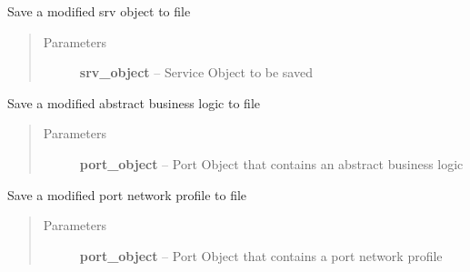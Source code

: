 \documentclass[letterpaper,10pt,english]{sphinxmanual}
\begin{document}
\begin{fulllineitems}

\begin{fulllineitems}
\label{class_Project:ROSMOD_Project.save_srv}
Save a modified srv object to file
\begin{quote}\begin{description}
\item[{Parameters}] \leavevmode
\textbf{srv\_object} -- Service Object to be saved

\end{description}\end{quote}

\end{fulllineitems}


\begin{fulllineitems}
\label{class_Project:ROSMOD_Project.save_abl}
Save a modified abstract business logic to file
\begin{quote}\begin{description}
\item[{Parameters}] \leavevmode
\textbf{port\_object} -- Port Object that contains an abstract business logic

\end{description}\end{quote}

\end{fulllineitems}


\begin{fulllineitems}
\label{class_Project:ROSMOD_Project.save_pnp}
Save a modified port network profile to file
\begin{quote}\begin{description}
\item[{Parameters}] \leavevmode
\textbf{port\_object} -- Port Object that contains a port network profile

\end{description}\end{quote}

\end{fulllineitems}



\end{fulllineitems}
\end{document}
